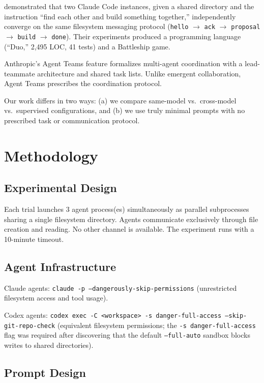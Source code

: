 \documentclass[11pt,a4paper]{article}
\begin{document}
\citet{papailiopoulos2026} demonstrated that two Claude Code instances, given a shared
directory and the instruction ``find each other and build something together,''
independently converge on the same filesystem messaging protocol
(\texttt{hello} $\to$ \texttt{ack} $\to$ \texttt{proposal} $\to$ \texttt{build} $\to$
\texttt{done}). Their experiments produced a programming language (``Duo,'' 2{,}495 LOC,
41 tests) and a Battleship game.

Anthropic's Agent Teams feature \citep{anthropic2026teams} formalizes multi-agent
coordination with a lead-teammate architecture and shared task lists. Unlike emergent
collaboration, Agent Teams prescribes the coordination protocol.

Our work differs in two ways: (a) we compare same-model vs.\ cross-model vs.\
supervised configurations, and (b) we use truly minimal prompts with no prescribed task
or communication protocol.

\section{Methodology}

\subsection{Experimental Design}

Each trial launches 3 agent process(es) simultaneously as
parallel subprocesses sharing a single filesystem directory. Agents communicate
exclusively through file creation and reading. No other channel is available. The
experiment runs with a 10-minute timeout.

\subsection{Agent Infrastructure}

Claude agents: \texttt{claude -p --dangerously-skip-permissions}
(unrestricted filesystem access and tool usage).

Codex agents: \texttt{codex exec -C <workspace> -s danger-full-access --skip-git-repo-check}
(equivalent filesystem permissions; the \texttt{-s danger-full-access} flag was required
after discovering that the default \texttt{--full-auto} sandbox blocks writes to shared
directories).

\subsection{Prompt Design}
\end{document}
